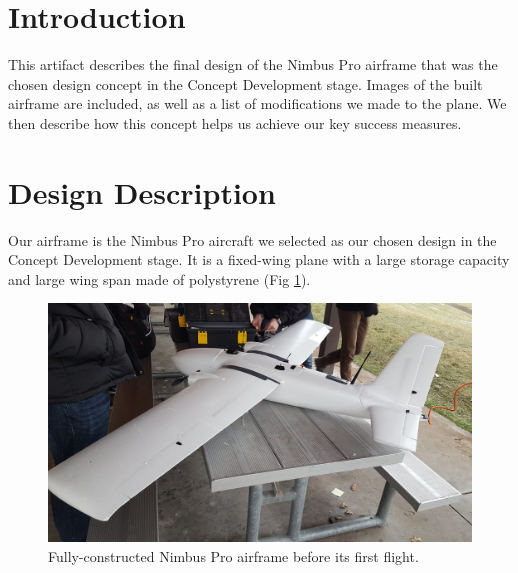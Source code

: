 \documentclass[]{auvsi_doc}
\begin{document}
\begin{AUVSITitlePage}
\begin{artifacttable}
\end{artifacttable}
\end{AUVSITitlePage}

\section{Introduction}
This artifact describes the final design of the Nimbus Pro airframe that was the chosen design concept in the Concept Development stage. Images of the built airframe are included, as well as a list of modifications we made to the plane. We then describe how this concept helps us achieve our key success measures.

\section{Design Description}
Our airframe is the Nimbus Pro aircraft we selected as our chosen design in the Concept Development stage. It is a fixed-wing plane with a large storage capacity and large wing span made of polystyrene (Fig \ref{fig:plane1}).

\begin{figure}[h!]
	\centering
	\includegraphics[width=.9\columnwidth]{plane1}
	\caption{Fully-constructed Nimbus Pro airframe before its first flight.}
	\label{fig:plane1}
\end{figure} 
\end{document}
